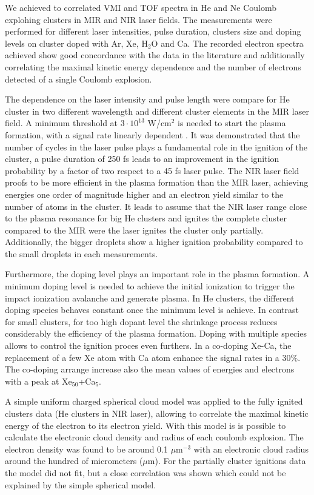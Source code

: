 We achieved to correlated VMI and TOF spectra in He and Ne Coulomb explohing clusters in MIR and NIR laser fields. The measurements were performed for different laser intensities, pulse duration, clusters size and doping levels on cluster doped with Ar, Xe, H$_2$O and Ca. The recorded electron spectra achieved show good concordance with the data in the literature \cite{kelbg_auger_2019} and additionally correlating the maximal kinetic energy dependence and the number of electrons detected of a single Coulomb explosion.

The dependence on the laser intensity and pulse length were compare for He cluster in two different wavelength and different cluster elements in the MIR laser field. A minimum threshold at $3\cdot10^{13}$ W/cm$^{2}$ is needed to start the plasma formation, with a  signal rate linearly dependent . It was demonstrated that the number of cycles in the laser pulse plays a fundamental role in the ignition of the cluster, a pulse duration of 250 fs leads to an improvement in the ignition probability by a factor of two respect to a 45 fs laser pulse. The NIR laser field proofs to be more efficient in the plasma formation than the MIR laser, achieving energies one order of magnitude higher and an electron yield similar to the number of atoms in the cluster. It leads to assume that the NIR laser range close to the plasma resonance for big He clusters and ignites the complete cluster compared to the MIR were the laser ignites the cluster only partially. Additionally, the bigger droplets show a higher ignition probability compared to the small droplets in each measurements.

Furthermore, the doping level plays an important role in the plasma formation. A minimum doping level is needed to achieve the initial ionization to trigger the impact ionization avalanche and generate plasma. In He clusters, the different doping species behaves constant once the minimum level is achieve. In contrast for small clusters, for too high dopant level the  shrinkage process reduces considerably the efficiency of the plasma formation. Doping with multiple species allows to control the ignition proces even furthers. In a co-doping Xe-Ca, the replacement of a few Xe atom with Ca atom enhance the signal rates in a 30$\%$. The co-doping arrange increase also the mean values of energies and electrons with a peak at Xe$_{50}$+Ca$_{5}$.

A simple uniform charged spherical cloud model was applied to the fully ignited clusters data (He clusters in NIR laser), allowing to correlate the maximal kinetic energy of the electron to its electron yield. With this model is is possible to calculate the electronic cloud density and radius of each coulomb explosion. The  electron density was found to be around 0.1 $\mu$m$^{-3}$ with an electronic cloud radius around the hundred of micrometers ($\mu$m). For the partially cluster ignitions data the model did not fit, but a close correlation was shown which could not be explained by the simple spherical model.

